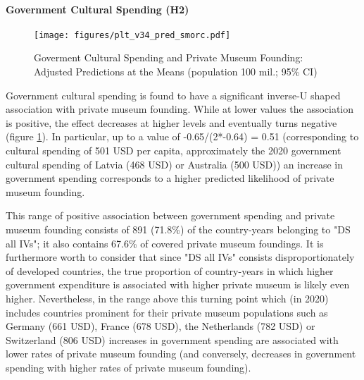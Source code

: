 \documentclass[11pt, authoryear]{elsarticle}
\begin{document}
\paragraph*{Government Cultural Spending (H2)}

\begin{figure}[htbp]
\centering
\texttt{[image: figures/plt\_v34\_pred\_smorc.pdf]}
\caption{\label{fig:pred_smorc}Goverment Cultural Spending and Private Museum Founding: Adjusted Predictions at the Means (population 100 mil.; 95\% CI)}
\end{figure}

Government cultural spending is found to have a significant inverse-U shaped association with private museum founding.
While at lower values the association is positive, the effect decreases at higher levels and eventually turns negative (figure \ref{fig:pred_smorc}).
In particular, up to a value of -0.65/(2*-0.64) = 0.51 (corresponding to cultural spending of 501 USD per capita, approximately the 2020 government cultural spending of Latvia (468 USD) or Australia (500 USD)) an increase in government spending corresponds to a higher predicted likelihood of private museum founding.


This range of positive association between government spending and private museum founding consists of 891 (71.8\%) of the country-years belonging to "DS all IVs"; it also contains 67.6\% of covered private museum foundings.
It is furthermore worth to consider that since "DS all IVs" consists disproportionately of developed countries, the true proportion of country-years in which higher government expenditure is associated with higher private museum is likely even higher.
Nevertheless, in the range above this turning point which (in 2020) includes countries prominent for their private museum populations such as Germany (661 USD), France (678 USD), the Netherlands (782 USD) or Switzerland (806 USD) increases in government spending are associated with lower rates of private museum founding (and conversely, decreases in government spending with higher rates of private museum founding).
\end{document}
